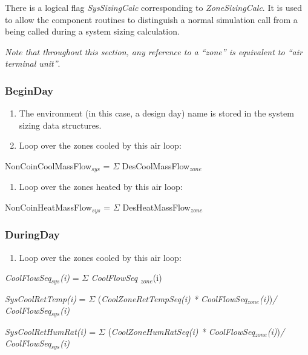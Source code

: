 There is a logical flag \emph{SysSizingCalc} corresponding to \emph{ZoneSizingCalc}. It is used to allow the component routines to distinguish a normal simulation call from a being called during a system sizing calculation.

\emph{Note that throughout this section, any reference to a ``zone'' is equivalent to ``air terminal unit''}.

\subsubsection{BeginDay}\label{beginday}

\begin{enumerate}
\def\labelenumi{(\arabic{enumi})}
\item
  The environment (in this case, a design day) name is stored in the system sizing data structures.
\item
  Loop over the zones cooled by this air loop:
\end{enumerate}

{\setlength\parindent{25pt} NonCoinCoolMassFlow\(_{sys}\) = $\Sigma$ {DesCoolMassFlow\(_{zone}\)} }

\begin{enumerate}
\def\labelenumi{(\arabic{enumi})}
\setcounter{enumi}{2}
\tightlist
\item
  Loop over the zones heated by this air loop:
\end{enumerate}

{\setlength\parindent{25pt} NonCoinHeatMassFlow\(_{sys}\) = $\Sigma$ {DesHeatMassFlow\(_{zone}\)} }

\subsubsection{DuringDay}\label{duringday}

\begin{enumerate}
\def\labelenumi{(\arabic{enumi})}
\tightlist
\item
  Loop over the zones cooled by this air loop:
\end{enumerate}

\emph{CoolFlowSeq\(_{sys}\)(i)} = $\Sigma$ \emph{CoolFlowSeq \(_{zone}\)}(i)

\emph{SysCoolRetTemp(i)} = $\Sigma$ (\emph{CoolZoneRetTempSeq(i) * CoolFlowSeq\(_{zone}\)(i)})\emph{/ CoolFlowSeq\(_{sys}\)(i)}

\emph{SysCoolRetHumRat(i)} = $\Sigma$ (\emph{CoolZoneHumRatSeq(i) * CoolFlowSeq\(_{zone}\)(i)})\emph{/ CoolFlowSeq\(_{sys}\)(i)}


